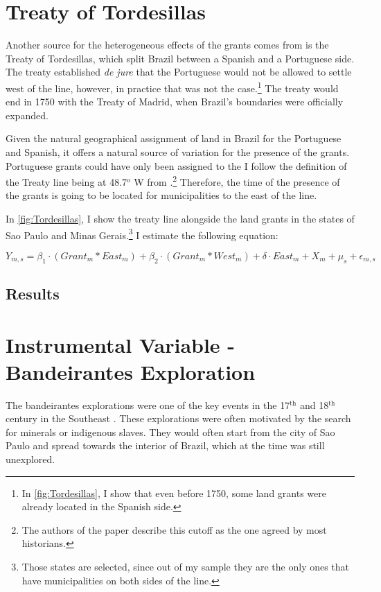 \documentclass{article}
\begin{document}
\section{Treaty of Tordesillas}

Another source for the heterogeneous effects of the grants comes from is the Treaty of Tordesillas, which split Brazil between a Spanish and a Portuguese side. 
The treaty established \textit{de jure} that the Portuguese would not be allowed to settle west of the line, however, in practice that was not the case.\footnote{In \autoref{fig:Tordesillas}, I show that even before 1750, some land grants were already located in the Spanish side.}
The treaty would end in 1750 with the Treaty of Madrid, when Brazil's boundaries were officially expanded.

Given the natural geographical assignment of land in Brazil for the Portuguese and Spanish, it offers a natural source of variation for the presence of the grants.
Portuguese grants could have only been assigned to the 
I follow the definition of the Treaty line being at 48.7$^o$ W from  \textcite{Laudares2022-vy}.\footnote{The authors of the paper describe this cutoff as the one agreed by most historians.}
Therefore, the time of the presence of the grants is going to be located for municipalities to the east of the line.

In \autoref{fig:Tordesillas}, I show the treaty line alongside the land grants in the states of Sao Paulo and Minas Gerais.\footnote{Those states are selected, since out of my sample they are the only ones that have municipalities on both sides of the line.}
I estimate the following equation:

\begin{equation}
  \label{eqn:tordesillas}
  Y_{m,s} = \beta_1 \cdot (Grant_m  * East_m) + \beta_2 \cdot (Grant_m * West_m) + \delta \cdot  East_m + X_{m} + \mu_s + \epsilon_{m,s}
\end{equation}

\subsection{Results}

\section{Instrumental Variable - Bandeirantes Exploration}

The bandeirantes explorations were one of the key events in the 17$^{\text{th}}$ and 18$^\text{th}$ century in the Southeast \parencite[p.~46-47]{Fausto2014-bh}. 
These explorations were often motivated by the search for minerals or indigenous slaves. 
They would often start from the city of Sao Paulo and spread towards the interior of Brazil, which at the time was still unexplored. 
\end{document}

